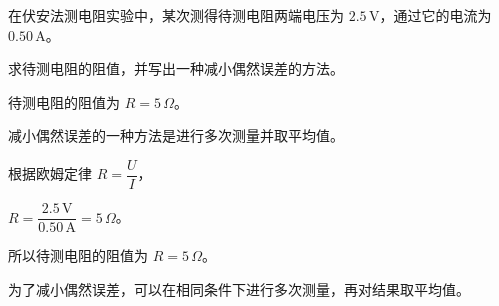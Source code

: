 
\begin{problem}
在伏安法测电阻实验中，某次测得待测电阻两端电压为 $2.5\,\mathrm{V}$，通过它的电流为 $0.50\,\mathrm{A}$。

求待测电阻的阻值，并写出一种减小偶然误差的方法。
\end{problem}

\begin{answer}
待测电阻的阻值为 $R=5\,\Omega$。

减小偶然误差的一种方法是进行多次测量并取平均值。
\end{answer}

\begin{solutions}
根据欧姆定律 $R=\dfrac{U}{I}$，

$R=\dfrac{2.5\,\mathrm{V}}{0.50\,\mathrm{A}}=5\,\Omega$。

所以待测电阻的阻值为 $R=5\,\Omega$。

为了减小偶然误差，可以在相同条件下进行多次测量，再对结果取平均值。
\end{solutions}
